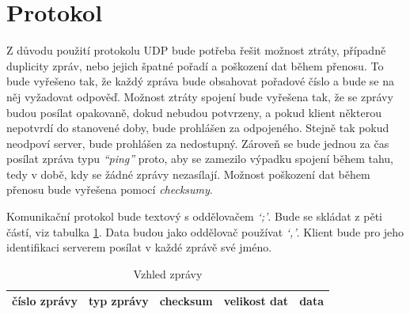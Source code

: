 \documentclass[12pt, a4paper]{article}
\begin{document}
	\section{Protokol}
	Z důvodu použití protokolu UDP bude potřeba řešit možnost ztráty, případně duplicity zpráv, nebo jejich špatné pořadí a poškození dat během přenosu. To bude vyřešeno tak, že každý zpráva bude obsahovat pořadové číslo a bude se na něj vyžadovat odpověď. Možnost ztráty spojení bude vyřešena tak, že se zprávy budou posílat opakovaně, dokud nebudou potvrzeny, a pokud klient některou nepotvrdí do stanovené doby, bude prohlášen za odpojeného. Stejně tak pokud neodpoví server, bude prohlášen za nedostupný. Zároveň se bude jednou za čas posílat zpráva typu \emph{“ping”} proto, aby se zamezilo výpadku spojení během tahu, tedy v době, kdy se žádné zprávy nezasílají. Možnost poškození dat během přenosu bude vyřešena pomocí \emph{checksumy}.

	Komunikační protokol bude textový s oddělovačem \emph{‘;’}. Bude se skládat z pěti částí, viz tabulka \ref{Vzhled}. Data budou jako oddělovač používat \emph{‘,’}. Klient bude pro jeho identifikaci serverem posílat v každé zprávě své jméno.
		\begin{table}[ht!]
			\centering
			\caption{Vzhled zprávy}
			\label{Vzhled}
			\begin{tabular}{| c | c | c | c | c |}
				\hline
				číslo zprávy & typ zprávy & checksum & velikost dat & data\\
				\hline
			\end{tabular}
		\end{table}
	
\end{document}
